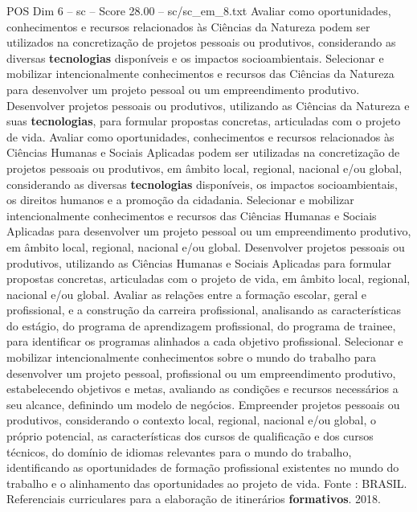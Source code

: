 \begin{textsample}{POS Dim 6 – sc – Score 28.00 – sc/sc\_em\_8.txt}
Avaliar como oportunidades, conhecimentos e recursos relacionados às Ciências da Natureza podem ser utilizados na concretização de projetos pessoais ou produtivos, considerando as diversas \textbf{tecnologias} disponíveis e os impactos socioambientais.
Selecionar e mobilizar intencionalmente conhecimentos e recursos das Ciências da Natureza para desenvolver um projeto pessoal ou um empreendimento produtivo.
Desenvolver projetos pessoais ou produtivos, utilizando as Ciências da Natureza e suas \textbf{tecnologias}, para formular propostas concretas, articuladas com o projeto de vida.
Avaliar como oportunidades, conhecimentos e recursos relacionados às Ciências Humanas e Sociais Aplicadas podem ser utilizadas na concretização de projetos pessoais ou produtivos, em âmbito local, regional, nacional e/ou global, considerando as diversas \textbf{tecnologias} disponíveis, os impactos socioambientais, os direitos humanos e a promoção da cidadania.
Selecionar e mobilizar intencionalmente conhecimentos e recursos das Ciências Humanas e Sociais Aplicadas para desenvolver um projeto pessoal ou um empreendimento produtivo, em âmbito local, regional, nacional e/ou global.
Desenvolver projetos pessoais ou produtivos, utilizando as Ciências Humanas e Sociais Aplicadas para formular propostas concretas, articuladas com o projeto de vida, em âmbito local, regional, nacional e/ou global.
Avaliar as relações entre a formação escolar, geral e profissional, e a construção da carreira profissional, analisando as características do estágio, do programa de aprendizagem profissional, do programa de trainee, para identificar os programas alinhados a cada objetivo profissional.
Selecionar e mobilizar intencionalmente conhecimentos sobre o mundo do trabalho para desenvolver um projeto pessoal, profissional ou um empreendimento produtivo, estabelecendo objetivos e metas, avaliando as condições e recursos necessários a seu alcance, definindo um modelo de negócios.
Empreender projetos pessoais ou produtivos, considerando o contexto local, regional, nacional e/ou global, o próprio potencial, as características dos cursos de qualificação e dos cursos técnicos, do domínio de idiomas relevantes para o mundo do trabalho, identificando as oportunidades de formação profissional existentes no mundo do trabalho e o alinhamento das oportunidades ao projeto de vida.
Fonte : BRASIL.
Referenciais curriculares para a elaboração de itinerários \textbf{formativos}. 2018.

\end{textsample}
